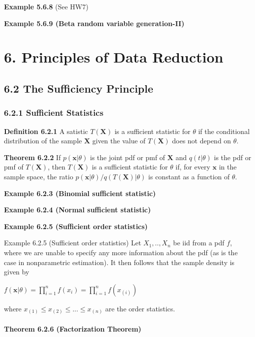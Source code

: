\documentclass[6pt,twocolumn,Portrait]{article}
\let\oldparagraph\paragraph
\renewcommand{\paragraph}[1]{\oldparagraph{#1}\mbox{}}
\begin{document}
\textbf{Example 5.6.8} (See HW7)

\textbf{Example 5.6.9 (Beta random variable generation-II)}

\hypertarget{principles-of-data-reduction}{%
\section{6. Principles of Data
Reduction}\label{principles-of-data-reduction}}

\hypertarget{the-sufficiency-principle}{%
\subsection{6.2 The Sufficiency
Principle}\label{the-sufficiency-principle}}

\hypertarget{suff}{%
\subsubsection{6.2.1 Sufficient Statistics}\label{suff}}

\textbf{Definition 6.2.1} A satistic \(T(\mathbf{X})\) is a sufficient
statistic for \(\theta\) if the conditional distribution of the sample
\(\mathbf{X}\) given the value of \(T(\mathbf{X})\) does not depend on
\(\theta\).

\textbf{Theorem 6.2.2} If \(p(\mathbf{x}|\theta)\) is the joint pdf or
pmf of \(\mathbf{X}\) and \(q(t|\theta)\) is the pdf or pmf of
\(T(\mathbf{X})\), then \(T(\mathbf{X})\) is a sufficient statistic for
\(\theta\) if, for every \(\mathbf{x}\) in the sample space, the ratio
\(p(\mathbf{x}|\theta)/q(T(\mathbf{X})|\theta)\) is constant as a
function of \(\theta\).

\textbf{Example 6.2.3 (Binomial sufficient statistic)}

\textbf{Example 6.2.4 (Normal sufficient statistic)}

\textbf{Example 6.2.5 (Sufficient order statistics)}

Example 6.2.5 (Sufficient order statistics) Let \(X_1,..,X_n\) be iid
from a pdf \(f\), where we are unable to specify any more information
about the pdf (as is the case in nonparametric estimation). It then
follows that the sample density is given by

\(f(\mathbf{x}|\theta)=\prod_{i=1}^nf(x_i)=\prod_{i=1}^nf(x_{(i)})\)

where \(x_{(1)}\le x_{(2)}\le...\le x_{(n)}\) are the order statistics.

\hypertarget{Facto}{%
\paragraph{\texorpdfstring{\textbf{Theorem 6.2.6 (Factorization
Theorem)}}{Theorem 6.2.6 (Factorization Theorem)}}\label{Facto}}
\end{document}

